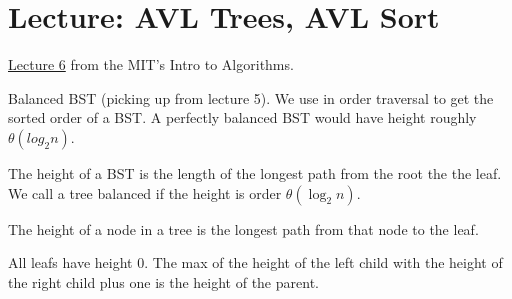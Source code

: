 \chapter{Lecture: AVL Trees, AVL Sort}
\href{https://ocw.mit.edu/courses/electrical-engineering-and-computer-science/6-006-introduction-to-algorithms-fall-2011/lecture-videos/lecture-6-avl-trees-avl-sort/}{Lecture 6} from the MIT's 
Intro to Algorithms.

Balanced BST (picking up from lecture 5). We use in order traversal to get the sorted order of a BST.
A perfectly balanced BST would have height roughly \(\theta(log_2 n)\). 
\begin{definition}
	The height of a BST is the length of the longest path from the root the the leaf. We call a tree balanced 
	if the height is order \(\theta(\log_2 n)\).
\end{definition}
\begin{definition}
	The height of a node in a tree is the longest path from that node to the leaf.
\end{definition}
\noindent
All leafs have height \(0\). The max of the height of the left child with the height of the right child plus
one is the height of the parent.

